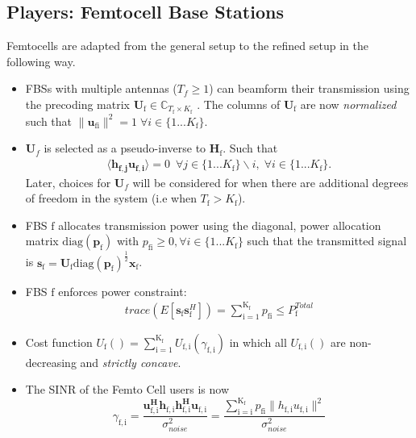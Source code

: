 \documentclass[12pt,a4paper]{report}
\begin{document}
\subsection{Players: Femtocell Base Stations}
Femtocells are adapted from the general setup to the refined setup in the following way.
\begin{itemize}
\item 
	FBSs with multiple antennas ($T_f \geq 1$) can beamform their transmission using the precoding 	
	matrix $\mathbf{U}_{\mathrm{\text{f}}} \in \mathbb{C}_{T_{\text{f}} \times K_{\text{f}}}$ .
	The columns of $\mathbf{U}_{\mathrm{f}}$ are now \emph{normalized} such that 
	 $\|\mathbf{u}_{\mathrm{fi}}\|^2 =1 \;\forall i \in \{1 ... K_{\text{f}}\}$.
\\

\item 
$\mathbf{U}_f$ is selected as a pseudo-inverse to $\mathbf{H_\mathrm{f}}$.
Such that
\begin{gather*}
\langle \mathbf{h_{f,j}}\mathbf{u_{f,i}} \rangle =0\  \; \forall j \in \{1... K_{\text{f}}\}\backslash i ,\; \forall i \in \{1 ... K_{\text{f}}\}.
\end{gather*} Later, choices for $\mathbf{U}_f$ will be considered for when there are additional degrees of freedom in the system (i.e when $T_{\text{f}}> K_{\text{f}}$).

\item  
	FBS $\text{f}$ allocates  transmission power using the diagonal, power allocation  	
	matrix $\mathrm{diag}(\mathbf{p}_{\mathrm{f}})$ with $p_{\mathrm{fi}} \geq 0, \forall i \in \{1 ... K_{\text{f}}\}$
such that the transmitted 		
	signal is 
	$\mathbf{s}_{\mathrm{f}	}= \mathbf{U_{\mathrm{f}}} 
	\mathrm{diag}(\mathbf{p}_{\mathrm{f}})^{\frac{1}{2}}
	\mathbf{x_{\mathrm{f}}}$.
\\
\item 
	FBS $\text{f}$ enforces power constraint:
	\begin{gather*}
	trace(E[\mathbf{s}_\mathrm{f}\mathbf{s}_\mathrm{f}^H]) =
	\sum_{\mathrm{i=1}}^{\mathrm{K_{\mathrm{f}}}} p_{\mathrm{fi}}
	  \leq P^{Total}_{\text{f}} 
	  	\end{gather*}



\item 
	Cost function $U_{\text{f}}() =
	\sum_{\mathrm{i=1}}^{\mathrm{K_{\text{f}}}}
    	U_{\mathrm{f,i}}(\gamma_{\mathrm{f,i}}) $
    	in which all $U_{\mathrm{f,i}}()$ are non-decreasing and
    	\emph{strictly concave}.
\item The SINR of the Femto Cell users is now
\begin{equation}\label{zf_snr}
	\gamma_{\mathrm{f,i}} = 	\frac{\mathbf{u^H_{\mathrm{f,i}}h_{\mathrm{f,i}}h^H_{\mathrm{f,i}}u_{\mathrm{f,i}}}}
	{\sigma^2_{noise}  
	}=\frac{\sum_{\mathrm{i=i}}^{\mathrm{K_{f}}}
 p_{\mathrm{fi}}\|h_{\mathrm{f,i}}u_{\mathrm{f,i}}\|^2}
	{\sigma^2_{noise}  
	}
	\end{equation}

\end{itemize}
\end{document}
